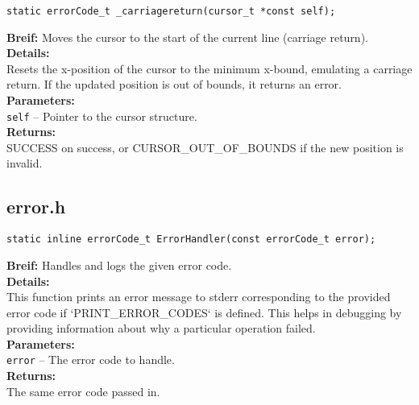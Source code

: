\begin{verbatim}
static errorCode_t _carriagereturn(cursor_t *const self);
\end{verbatim}
\textbf{Breif:} Moves the cursor to the start of the current line (carriage return). \\
\textbf{Details:} \\    
\hspace*{1cm}Resets the x-position of the cursor to the minimum x-bound, emulating a carriage return. If the updated position is out of bounds, it returns an error. \\
\textbf{Parameters:} \\
\hspace*{1cm}\texttt{self} -- Pointer to the cursor structure. \\
\textbf{Returns:} \\
\hspace*{1cm}SUCCESS on success, or CURSOR\_OUT\_OF\_BOUNDS if the new position is invalid. \\[1em]

\subsection{error.h}


\begin{verbatim}
static inline errorCode_t ErrorHandler(const errorCode_t error);
\end{verbatim}
\textbf{Breif:} Handles and logs the given error code. \\
\textbf{Details:} \\
\hspace*{1cm}This function prints an error message to stderr corresponding to the provided error code if `PRINT\_ERROR\_CODES` is defined. This helps in debugging by providing information about why a particular operation failed. \\
\textbf{Parameters:} \\
\hspace*{1cm}\texttt{error} -- The error code to handle. \\
\textbf{Returns:} \\
\hspace*{1cm}The same error code passed in. \\[1em]


